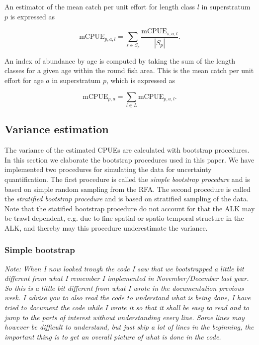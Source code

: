 \documentclass[a4paper 12pt]{article}
\numberwithin{equation}{section}
\begin{document}
An estimator of the mean catch per unit effort for length class $l$ in superstratum $p$ is expressed as


\begin{equation}
\mathrm{mCPUE}_{p,a,l} =  \sum\limits_{s \in S_{p}} \frac{\mathrm{mCPUE}_{s,a,l}}{|S_{p}|}.
\label{mcpueagerfa}
\end{equation}

An index of abundance by age is computed by taking the sum of the length classes for a given age within the round fish area. This is the mean catch per unit effort for age $a$ in superstratum $p$, which is expressed as

\begin{equation}
\mathrm{mCPUE}_{p,a} =  \sum\limits_{l \in L} \mathrm{mCPUE}_{p,a,l}.
\label{ageIndex}
\end{equation}



\subsection{Variance estimation}
\label{bootall}
The variance of the estimated CPUEs are calculated with bootstrap procedures. In this section we elaborate the bootstrap procedures used in this paper. We have implemented two procedures for simulating the data for uncertainty quantification. The first procedure is called the \textit{simple bootstrap procedure} and is based on simple random sampling from the RFA. The second procedure is called the \textit{stratified bootstrap procedure} and is based on stratified sampling of the data. Note that the statified bootstrap procedure do not account for that the ALK may be trawl dependent, e.g. due to fine spatial or spatio-temporal structure in the ALK, and thereby may this procedure underestimate the variance.

\subsubsection{Simple bootstrap}
\label{simpleboot}
\textit{Note: When I now looked trough the code I saw that we bootstrapped a little bit different from what I remember I implemented in November/December last year. So this is a little bit different from what I wrote in the documentation previous week. I advise you to also read the code to understand what is being done, I have tried to document the code while I wrote it so that it shall be easy to read and to jump to the parts of interest without understanding every line. Some lines may however be difficult to understand, but just skip a lot of lines in the beginning, the important thing is to get an overall picture of what is done in the code.}
\end{document}
